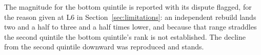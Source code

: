 The magnitude for the bottom quintile is reported with its dispute flagged, for the
reason given at L6 in Section~\ref{sec:limitations}: an independent rebuild lands
two and a half to three and a half times lower, and because that range straddles the second
quintile the bottom quintile's rank is not established. The decline from the second quintile
downward was reproduced and stands.
